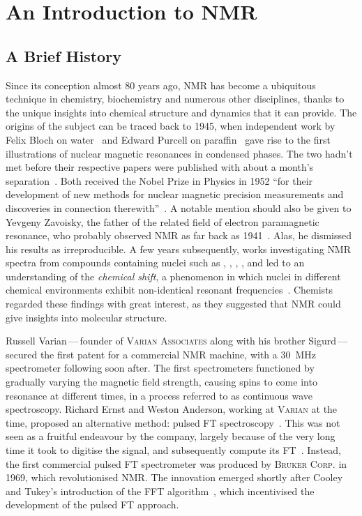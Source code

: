 \section{An Introduction to \acs{NMR}}

\subsection{A Brief History}
Since its conception almost 80 years ago, \ac{NMR} has become a ubiquitous
technique in chemistry, biochemistry and numerous other disciplines, thanks to
the unique insights into chemical structure and dynamics that it
can provide.
The origins of the subject can be traced back to 1945, when independent work by
Felix Bloch on water~\cite{Bloch1946} and Edward Purcell on
paraffin~\cite{Purcell1946} gave rise to the first illustrations of nuclear
magnetic resonances in condensed phases. The two hadn't met before their
respective papers were published with about a month's
separation~\cite{Becker1993}. Both received the Nobel Prize in Physics in 1952
``for their development of new methods for nuclear magnetic precision
measurements and discoveries in connection therewith''~\cite{Nobel1952}. A
notable mention should also be given
to Yevgeny Zavoisky, the father of the related field of electron paramagnetic
resonance, who probably observed NMR as far back as 1941~\cite{Eaton1998}. Alas,
he dismissed
his results as irreproducible. A few years subsequently, works investigating
\ac{NMR} spectra from compounds containing nuclei such as ,
, , , and  led to an
understanding of the \emph{chemical shift}, a phenomenon in
which nuclei in different chemical environments exhibit
non-identical resonant frequencies~\cite{Knight1949, Proctor1950,
Dickinson1950}.  Chemists regarded these findings with great
interest, as they suggested that \ac{NMR} could give insights into molecular
structure.

Russell Varian\,---\,founder of \textsc{Varian Associates} along with his brother
Sigurd\,---\,
secured the first patent for a commercial \ac{NMR} machine, with
a \qty{30}{\mega\hertz} spectrometer following soon after. The first
spectrometers functioned by gradually varying the magnetic field strength,
causing spins to come into resonance at different times, in a process referred
to as continuous wave spectroscopy. Richard Ernst and
Weston Anderson, working at \textsc{Varian} at the time, proposed an alternative
method: pulsed \ac{FT} spectroscopy~\cite{Ernst1966}. This was not seen as a
fruitful endeavour by the company, largely because of the very long time it
took to digitise the signal, and subsequently compute its FT~\cite{Freeman2015}.
Instead, the first commercial pulsed \ac{FT} spectrometer was produced by
\textsc{Bruker Corp.} in 1969, which revolutionised NMR. The innovation emerged
shortly after Cooley and Tukey's introduction of the \ac{FFT}
algorithm~\cite{Cooley1965}, which incentivised the development of the pulsed
\ac{FT} approach.

